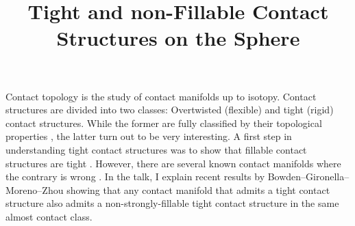\documentclass{article}
\title{Tight and non-Fillable Contact Structures on the Sphere}
\date{\vspace*{-2cm}}
\begin{document}
\maketitle
\noindent
Contact topology is the study of contact manifolds up to isotopy. 
Contact structures are divided into two classes: Overtwisted (flexible) and tight (rigid) contact structures.
While the former are fully classified by their topological properties \cite{Eliashberg89,BEM15}, the latter turn out to be very interesting. 
A first step in understanding tight contact structures was to show that fillable contact structures are tight \cite{Gromov85,Eliashberg91}. 
However, there are several known contact manifolds where the contrary is wrong \cite{EH02,MNW13}. 
In the talk, I explain recent results by Bowden--Gironella--Moreno--Zhou \cite{BGMZ22} showing that any contact manifold that admits a tight contact structure also admits a non-strongly-fillable tight contact structure in the same almost contact class.


\end{document}
